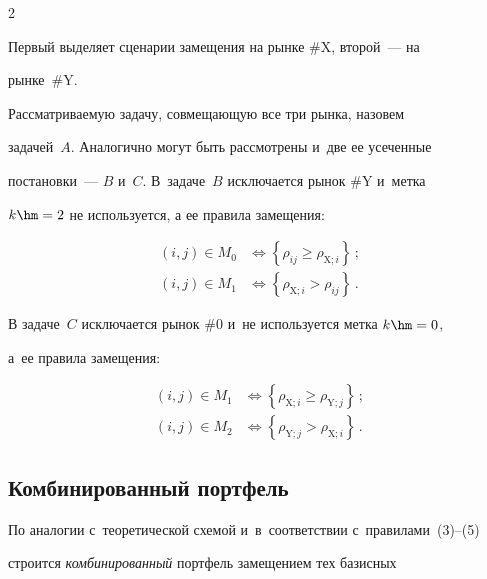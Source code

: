 \begin{multicols}{2}
  


  Первый выделяет сценарии замещения на рынке \#X, второй~--- на 


рынке~\#Y. 


  


  Рассматриваемую задачу, совмещающую все три рынка, назовем 


задачей~$A$. Аналогично могут быть рассмотрены и~две ее усеченные 


постановки~--- $B$ и~$C$. В~задаче~$B$ исключается рынок \#Y и~метка 


$k\hm = 2$ не используется, а ее правила замещения:


  \begin{align*}


  (i,j)\in M_0 &\Leftrightarrow \left\{ \rho_{ij}\geq \rho_{\mathrm{X};i}\right\}\,;\\


  (i,j)\in M_1 &\Leftrightarrow \left\{ \rho_{\mathrm{X};i}>\rho_{ij}\right\}\,.


  \end{align*}


  


  В задаче~$C$ исключается рынок \#0 и~не используется метка $k\hm = 0$, 


а~ее правила замещения: 


  \begin{align*}


  (i,j)\in M_1 &\Leftrightarrow \left\{ \rho_{\mathrm{X};i}\geq 


\rho_{\mathrm{Y};j}\right\}\,;\\


  (i,j) \in M_2 &\Leftrightarrow \left\{ \rho_{\mathrm{Y};j}> 


\rho_{\mathrm{X};i}\right\}\,.


  \end{align*}


  


  \subsection{Комбинированный портфель }


  


  По аналогии с~теоретической схемой и~в~соответствии с~правилами~(3)--(5) 


строится \textit{комбинированный} портфель замещением тех базисных 



\end{multicols}
